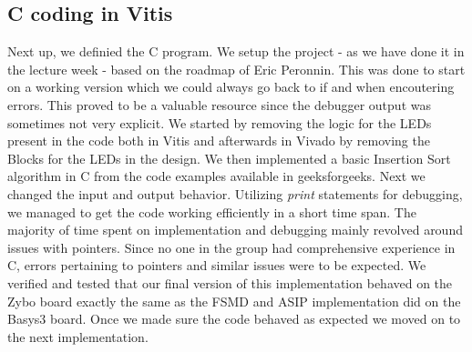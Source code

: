 \documentclass[conference]{IEEEtran}
\begin{document}
\subsection{C coding in Vitis}
Next up, we definied the C program. We setup the project - as we have done it in the lecture week - based on the roadmap of Eric Peronnin. This was done to start on a working version which we could always go back to if and when encoutering errors. This proved to be a valuable resource since the debugger output was sometimes not very explicit. We started by removing the logic for the LEDs present in the code both in Vitis and afterwards in Vivado by removing the Blocks for the LEDs in the design. We then implemented a basic Insertion Sort algorithm in C from the code examples available in geeksforgeeks\cite{g4g}. Next we changed the input and output behavior. Utilizing \textit{print} statements for debugging, we managed to get the code working efficiently in a short time span. The majority of time spent on implementation and debugging mainly revolved around issues with pointers. Since no one in the group had comprehensive experience in C, errors pertaining to pointers and similar issues were to be expected. We verified and tested that our final version of this implementation behaved on the Zybo board exactly the same as the FSMD and ASIP implementation did on the Basys3 board. Once we made sure the code behaved as expected we moved on to the next implementation.
\end{document}

